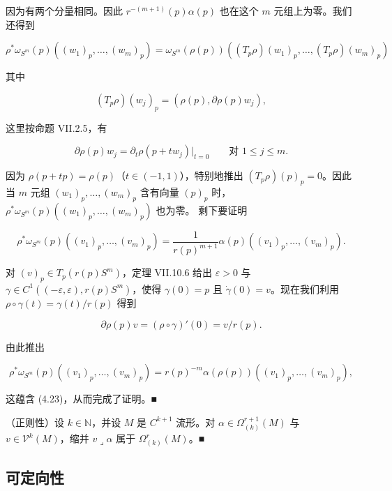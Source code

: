 \begin{examplenote}
\begin{items}
因为有两个分量相同。因此 $ r^{-(m+1)}(p)\alpha(p) $ 也在这个 $ m $ 元组上为零。我们还得到

\[
\rho^{*}\omega_{S^{m}}(p)((w_1)_p,\ldots,(w_m)_p) = \omega_{S^{m}}(\rho(p))((T_{p}\rho)(w_1)_p,\ldots,(T_{p}\rho)(w_m)_p)
\]

其中

\[
(T_{p}\rho)(w_j)_p = (\rho(p), \partial\rho(p)w_j) ,
\]

这里按命题 VII.2.5，有

\[
\partial\rho(p)w_j = \partial_{t}\rho(p + tw_j)\big|_{t=0} \qquad \text{对 } 1 \le j \le m .
\]

因为 $ \rho(p+tp) = \rho(p) $（$ t \in (-1,1) $），特别地推出 $ (T_{p}\rho)(p)_p = 0 $。因此当 $ m $ 元组 $ (w_1)_p, \ldots, (w_m)_p $ 含有向量 $ (p)_p $ 时，$ \rho^{*}\omega_{S^{m}}(p)((w_1)_p,\ldots,(w_m)_p) $ 也为零。
剩下要证明

\begin{equation}
\rho^{*}\omega_{S^{m}}(p)((v_1)_p,\ldots,(v_m)_p) = \frac{1}{r(p)^{m+1}} \alpha(p)((v_1)_p,\ldots,(v_m)_p) .\tag{4.23}
\end{equation}

对 $ (v)_p \in T_{p}(r(p)S^{m}) $，定理 VII.10.6 给出 $ \varepsilon > 0 $ 与 $ \gamma \in C^{1}((-\varepsilon,\varepsilon), r(p)S^{m}) $，使得 $ \gamma(0) = p $ 且 $ \dot{\gamma}(0) = v $。现在我们利用 $ \rho \circ \gamma(t) = \gamma(t)/r(p) $ 得到

\[
\partial\rho(p)v = (\rho \circ \gamma)'(0) = v/r(p) .
\]

由此推出

\[
\rho^{*}\omega_{S^{m}}(p)((v_1)_p,\ldots,(v_m)_p) = r(p)^{-m}\alpha(\rho(p))((v_1)_p,\ldots,(v_m)_p) ,
\]

这蕴含 (4.23)，从而完成了证明。\nobreak\hspace{0.35em}■

\item

（正则性）设 $ k \in \mathbb{N} $，并设 $ M $ 是 $ C^{k+1} $ 流形。对 $ \alpha \in \Omega^{r+1}_{(k)}(M) $ 与 $ v \in \mathcal{V}^{k}(M) $，缩并 $ v \lrcorner \alpha $ 属于 $ \Omega^{r}_{(k)}(M) $。\nobreak\hspace{0.35em}■

\end{items}

\end{examplenote}

\subsection*{可定向性}

